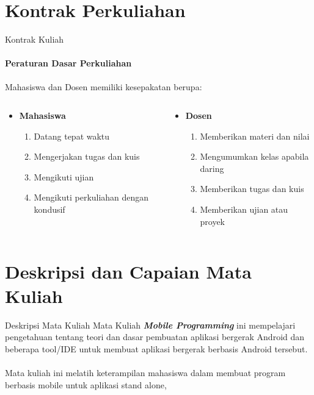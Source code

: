\documentclass[12pt,hyperref={colorlinks,citecolor=blue,urlcolor=peking_blue,linkcolor=},aspectratio=169]{beamer}
\theoremstyle{plain}
\begin{document}
\section{Kontrak Perkuliahan}
\begin{frame}{Kontrak Kuliah}
	\framesubtitle{Peraturan Dasar Perkuliahan}
	Mahasiswa dan Dosen memiliki kesepakatan berupa:
	\vfill
	\begin{columns}
		\begin{column}{.5\textwidth}
			\begin{itemize}
				\item \textbf{Mahasiswa}
				\begin{enumerate}
					\item Datang tepat waktu
					\item Mengerjakan tugas dan kuis
					\item Mengikuti ujian
					\item Mengikuti perkuliahan dengan kondusif
				\end{enumerate}
			\end{itemize}
		\end{column}
		\begin{column}{.5\textwidth}
			\begin{itemize}
				\item \textbf{Dosen}
				\begin{enumerate}
					\item Memberikan materi dan nilai
					\item Mengumumkan kelas apabila daring
					\item Memberikan tugas dan kuis
					\item Memberikan ujian atau proyek
				\end{enumerate}
			\end{itemize}
		\end{column}
	\end{columns}
\end{frame}

\section{Deskripsi dan Capaian Mata Kuliah}
\begin{frame}{Deskripsi Mata Kuliah}
	\justifying
	Mata Kuliah \textbf{\textit{Mobile Programming}} ini mempelajari pengetahuan tentang teori dan dasar pembuatan aplikasi bergerak Android dan beberapa tool/IDE untuk membuat aplikasi bergerak berbasis Android tersebut. \\~\\
	Mata kuliah ini melatih keterampilan mahasiswa dalam membuat program berbasis  mobile untuk aplikasi stand alone, 
\end{frame}
\end{document}
